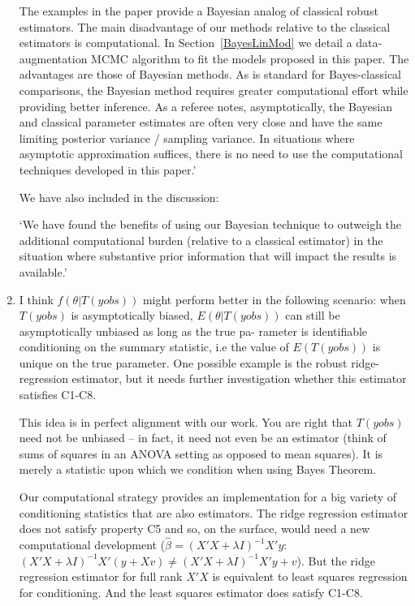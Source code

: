 \documentclass{article}
\newcommand{\response}[1]{{\color{blue}#1}}
\begin{document}
\begin{enumerate}
\response{The examples in the paper provide a Bayesian analog of classical robust estimators.  The main disadvantage of our methods relative to the classical estimators is computational.  In Section~\ref{BayesLinMod} we detail a data-augmentation MCMC algorithm to fit the models proposed in this paper.  The advantages are those of Bayesian methods.  As is standard for Bayes-classical comparisons, the Bayesian method requires greater computational effort while providing better inference.  As a referee notes, asymptotically, the Bayesian and classical parameter estimates are often very close and have the same limiting posterior variance / sampling variance.  In situations where asymptotic approximation suffices, there is no need to use the computational techniques developed in this paper.'}


\response{We have also included in the discussion:

`We have found the benefits of using our Bayesian technique to outweigh the additional computational burden (relative to a classical estimator) in the situation where substantive prior information that will impact the results is available.'
}



\item I think $f(\theta|T(yobs))$ might perform better in the following scenario: when $T(yobs)$ is asymptotically biased, $E(\theta|T(yobs))$ can still be asymptotically unbiased as long as the true pa- rameter is identifiable conditioning on the summary statistic, i.e the value of $E(T(yobs))$ is unique on the true parameter. One possible example is the robust ridge-regression estimator, but it needs further investigation whether this estimator satisfies C1-C8.

\response{This idea is in perfect alignment with our work.  You are right that $T(yobs)$ need not be unbiased -- in fact, it need not even be an estimator (think of sums of squares in an ANOVA setting as opposed to mean squares).  It is merely a statistic upon which we condition when using Bayes Theorem.  

Our computational strategy provides an implementation for a big variety of conditioning statistics that are also estimators.  The ridge regression estimator does not satisfy property C5 and so, on the surface, would need a new computational development ($\hat\beta = (X'X +\lambda I)^{-1} X'y$:   $(X'X +\lambda I)^{-1} X'(y + Xv) \neq (X'X +\lambda I)^{-1} X'y + v$). But the ridge regression estimator for full rank $X'X$ is equivalent to least squares regression for conditioning.  And the least squares estimator does satisfy C1-C8.  

}
\end{enumerate}
\end{document}
